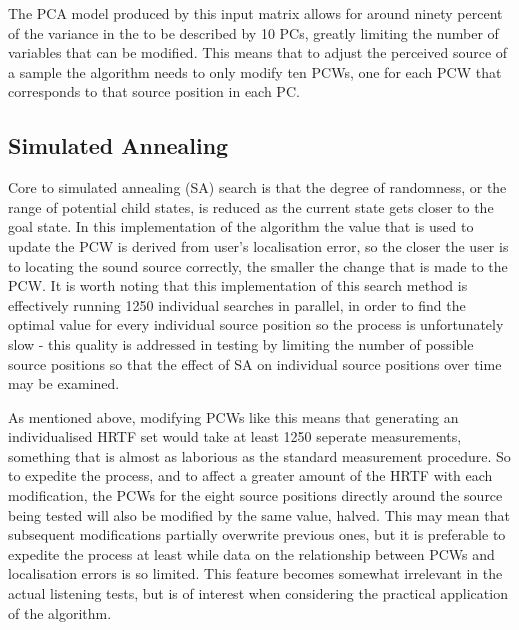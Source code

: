 The PCA model produced by this input matrix allows for around ninety percent of the variance in the to be described by 10 PCs, greatly limiting the number of variables that can be modified. This means that to adjust the perceived source of a sample the algorithm needs to only modify ten PCWs, one for each PCW that corresponds to that source position in each PC. 

\subsection{Simulated Annealing}
Core to simulated annealing (SA) search is that the degree of randomness, or the range of potential child states, is reduced as the current state gets closer to the goal state. In this implementation of the algorithm the value that is used to update the PCW is derived from user's localisation error, so the closer the user is to locating the sound source correctly, the smaller the change that is made to the PCW. It is worth noting that this implementation of this search method is effectively running 1250 individual searches in parallel, in order to find the optimal value for every individual source position so the process is unfortunately slow - this quality is addressed in testing by limiting the number of possible source positions so that the effect of SA on individual source positions over time may be examined.

As mentioned above, modifying PCWs like this means that generating an individualised HRTF set would take at least 1250 seperate measurements, something that is almost as laborious as the standard measurement procedure. So to expedite the process, and to affect a greater amount of the HRTF with each modification, the PCWs for the eight source positions directly around the source being tested will also be modified by the same value, halved. This may mean that subsequent modifications partially overwrite previous ones, but it is preferable to expedite the process at least while data on the relationship between PCWs and localisation errors is so limited. This feature becomes somewhat irrelevant in the actual listening tests, but is of interest when considering the practical application of the algorithm.

